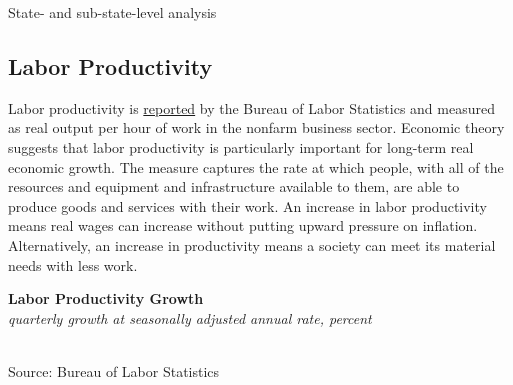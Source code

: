 \documentclass{report}
\makeatletter
\newcommand{\tbllink}[1]{\href{https://raw.githubusercontent.com/bdecon/US-chartbook/master/chartbook/data/#1}{\faTable}}
\newcommand*\short[1]{\expandafter\@gobbletwo\number\numexpr#1\relax}
\newcommand{\sbar}[4]{
		\addplot[ybar stacked, bar width=2.7pt, draw opacity=0, fill=#1] 
			table [x=#2, y=#3, col sep=comma]{#4};}
\newcommand{\dateaxisticks}{
		date coordinates in=x, axis line style={draw=none},
		xmax={2020-02-01},
		max space between ticks=40,	    
		xtick={{1990-01-01}, {1992-01-01}, {1994-01-01}, 
			{1996-01-01}, {1998-01-01}, {2000-01-01}, 
			{2002-01-01}, {2004-01-01}, {2006-01-01},
			{2008-01-01}, {2010-01-01}, {2012-01-01}, {2014-01-01},
		    {2016-01-01}, {2018-01-01}, {2020-01-01}},
		minor xtick={{1989-01-01}, {1991-01-01}, {1993-01-01},
			{1995-01-01}, {1997-01-01}, {1999-01-01}, 
			{2001-01-01}, {2003-01-01}, {2005-01-01}, {2007-01-01},
		    {2009-01-01}, {2011-01-01}, {2013-01-01}, {2015-01-01},
		    {2017-01-01}, {2019-01-01}},
		enlarge y limits={0.06}, enlarge x limits={0.01},
		}
\newcommand{\bbar}[2]{extra #1 ticks = {{#2}}, extra #1 tick labels = ,
		extra #1 tick style = {grid=major, grid style={thick, black!25}},}
\newcommand{\rbars}{
		\fill[color=black!10] (axis cs:{1990-07-01},\pgfkeysvalueof{/pgfplots/ymin}) rectangle 
			(axis cs:{1991-03-01}, \pgfkeysvalueof{/pgfplots/ymax});
		\fill[color=black!10] (axis cs:{2007-12-01},\pgfkeysvalueof{/pgfplots/ymin}) rectangle 
			(axis cs:{2009-07-01}, \pgfkeysvalueof{/pgfplots/ymax});
		\fill[color=black!10] (axis cs:{2001-03-01},\pgfkeysvalueof{/pgfplots/ymin}) rectangle 
			(axis cs:{2001-11-01}, \pgfkeysvalueof{/pgfplots/ymax});}
\makeatother
\begin{document}
{{{{\begin{minipage}{0.76\textwidth}
\vspace{2mm}

\normalsize

State- and sub-state-level analysis 



\end{minipage}

\newpage

\begin{minipage}{0.76\textwidth}


\subsection*{\color{black!70} \seriffont Labor Productivity}

\small Labor productivity is \href{https://www.bls.gov/news.release/prod2.nr0.htm}{reported} by the Bureau of Labor Statistics and measured as real output per hour of work in the nonfarm business sector. Economic theory suggests that labor productivity is particularly important for long-term real economic growth. The measure captures the rate at which people, with all of the resources and equipment and infrastructure available to them, are able to produce goods and services with their work. An increase in labor productivity means real wages can increase without putting upward pressure on inflation. Alternatively, an increase in productivity means a society can meet its material needs with less work.\\


\vspace{5mm}

\noindent \normalsize \textbf{Labor Productivity Growth}\\
\footnotesize{\textit{quarterly growth at seasonally adjusted annual rate, percent}}\\
\noindent \hspace*{-2mm} \\
\footnotesize{Source: Bureau of Labor Statistics} \hfill \tbllink{lprod.csv}\\

\vspace{3mm}


\end{minipage}}}}}
\end{document}
